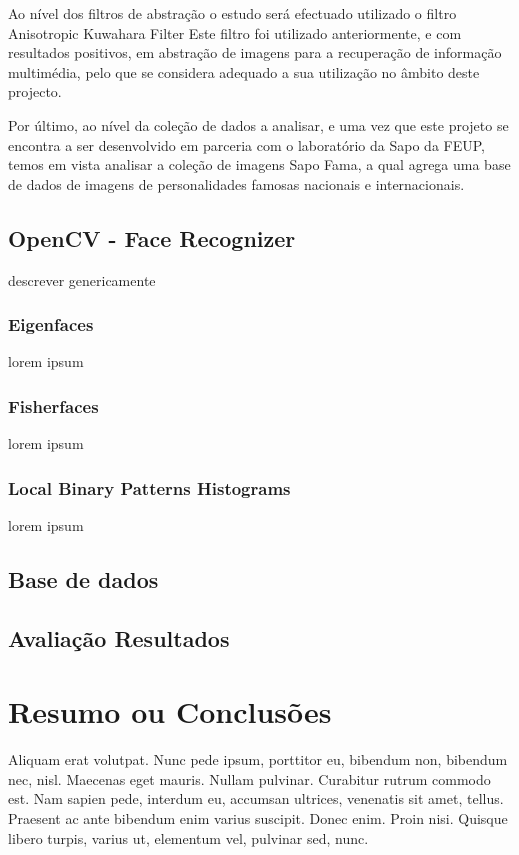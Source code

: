Ao nível dos filtros de abstração o estudo será efectuado utilizado o filtro Anisotropic Kuwahara Filter
Este filtro foi utilizado anteriormente, e com resultados positivos, em abstração de imagens para a recuperação de informação multimédia, pelo que se considera adequado a sua utilização no âmbito deste projecto.

Por último, ao nível da coleção de dados a analisar, e uma vez que este projeto se encontra a ser desenvolvido em parceria com o laboratório da Sapo da FEUP, temos em vista analisar a coleção de imagens Sapo Fama, a qual agrega uma base de dados de imagens de personalidades famosas nacionais e internacionais.

\subsection{OpenCV - Face Recognizer}
descrever genericamente 

\subsubsection{Eigenfaces}
lorem ipsum

\subsubsection{Fisherfaces}
lorem ipsum

\subsubsection{Local Binary Patterns Histograms}
lorem ipsum

\subsection{Base de dados}


\subsection{Avaliação Resultados}
	

\section{Resumo ou Conclusões}

Aliquam erat volutpat. Nunc pede ipsum, porttitor eu, bibendum non,
bibendum nec, nisl. Maecenas eget mauris. Nullam pulvinar. Curabitur
rutrum commodo est. Nam sapien pede, interdum eu, accumsan ultrices,
venenatis sit amet, tellus. Praesent ac ante bibendum enim varius
suscipit. Donec enim. Proin nisi. Quisque libero turpis, varius ut,
elementum vel, pulvinar sed, nunc. 
